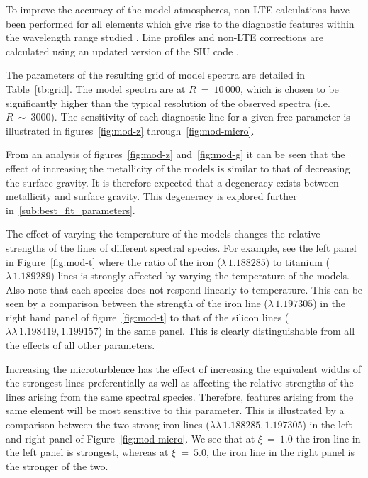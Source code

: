 \documentclass[12pt]{article}
\begin{document}
To improve the accuracy of the model atmospheres,
non-LTE calculations have been performed for all elements which give rise to the diagnostic features within the wavelength range studied
\citep{2012ApJ...751..156B,2013ApJ...764..115B,2014arXiv1412.6527B}.
Line profiles and non-LTE corrections are calculated using an updated version of the SIU code
\citep{1999PhDT.........3R,2012ApJ...751..156B}.

The parameters of the resulting grid of model spectra are detailed in
Table~\ref{tb:grid}.
The model spectra are at $R~=~10\,000$,
which is chosen to be significantly higher than the typical resolution of the observed spectra
(i.e. $R~\sim~3000$).
The sensitivity of each diagnostic line for a given free parameter is illustrated in figures~\ref{fig:mod-z} through~\ref{fig:mod-micro}.

From an analysis of figures~\ref{fig:mod-z} and~\ref{fig:mod-g} it can be seen that the effect of increasing the metallicity of the models is similar to that of decreasing the surface gravity.
It is therefore expected that a degeneracy exists between metallicity and surface gravity.
This degeneracy is explored further in~\ref{sub:best_fit_parameters}.

The effect of varying the temperature of the models changes the relative strengths of the lines of different spectral species.
For example, see the left panel in Figure~\ref{fig:mod-t} where the ratio of the iron
($\lambda\,1.188285$) to titanium ($\lambda\,1.189289$) lines is strongly affected by varying the temperature of the models.
Also note that each species does not respond linearly to temperature.
This can be seen by a comparison between the strength of the iron line
($\lambda\,1.197305$) in the right hand panel of figure~\ref{fig:mod-t} to that of the silicon lines
($\lambda\lambda\,1.198419, 1.199157$) in the same panel.
This is clearly distinguishable from all the effects of all other parameters.


Increasing the microturblence has the effect of increasing the equivalent widths
of the strongest lines preferentially as well as affecting the relative strengths of the lines arising from the same spectral species.
Therefore, features arising from the same element will be most sensitive to this
parameter.
This is illustrated by a comparison between the two strong iron lines
($\lambda\lambda\,1.188285, 1.197305$) in the left and
right panel of Figure~\ref{fig:mod-micro}.
We see that at $\xi~=~1.0$ the iron line in the left panel is strongest,
whereas at $\xi~=~5.0$, the iron line in the right panel is the stronger of the two.
\end{document}
